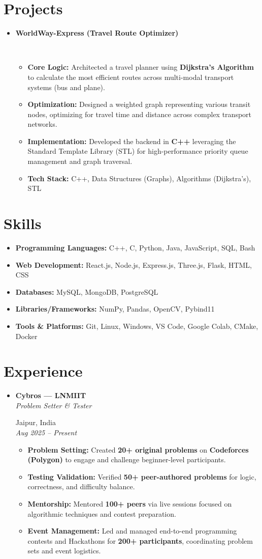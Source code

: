 \documentclass[a4paper,11pt]{article}
\newcommand{\resumeItem}[2]{
  \item\small{\textbf{#1:} #2 \vspace{-3pt}}
}
\newcommand{\resumeSubheading}[4]{%
  \item
  \begin{minipage}[t]{0.66\linewidth}%
    \textbf{#1}\\[2pt]%
    \textit{#3}%
  \end{minipage}%
  \hfill %
  \begin{minipage}[t]{0.32\linewidth}%
    \raggedleft #2 \\[2pt] \textit{#4}%
  \end{minipage}%
  \vspace{-6pt}%
}
\newcommand{\resumeSubItem}[2]{\resumeItem{#1}{#2}\vspace{-3pt}}
\newcommand{\resumeSubHeadingListStart}{\begin{itemize}[leftmargin=*]}
\newcommand{\resumeSubHeadingListEnd}{\end{itemize}\vspace{1pt}}
\newcommand{\resumeItemListStart}{\begin{itemize}[leftmargin=1.5em, label=\textbullet]}
\newcommand{\resumeItemListEnd}{\end{itemize}\vspace{-5pt}}
\begin{document}
\section{Projects}
\resumeSubHeadingListStart
\resumeSubheading
  {WorldWay-Express (Travel Route Optimizer)}
  {} %
  {}{} 
\resumeItemListStart
  \vspace{-11pt}
  \resumeItem{Core Logic}{Architected a travel planner using \textbf{Dijkstra’s Algorithm} to calculate the most efficient routes across multi-modal transport systems (bus and plane).}
  \resumeItem{Optimization}{Designed a weighted graph representing various transit nodes, optimizing for travel time and distance across complex transport networks.}
  \resumeItem{Implementation}{Developed the backend in \textbf{C++} leveraging the Standard Template Library (STL) for high-performance priority queue management and graph traversal.}
  \resumeItem{Tech Stack}{C++, Data Structures (Graphs), Algorithms (Dijkstra's), STL}
\resumeItemListEnd
\resumeSubHeadingListEnd
       \vspace{-5pt}
\section{Skills}
\resumeSubHeadingListStart
  \resumeSubItem{Programming Languages}{C++, C, Python, Java, JavaScript, SQL, Bash}
  \resumeSubItem{Web Development}{React.js, Node.js, Express.js, Three.js, Flask, HTML, CSS}
  \resumeSubItem{Databases}{MySQL, MongoDB, PostgreSQL}
  \resumeSubItem{Libraries/Frameworks}{NumPy, Pandas, OpenCV, Pybind11}
  \resumeSubItem{Tools \& Platforms}{Git, Linux, Windows, VS Code, Google Colab, CMake, Docker}
\resumeSubHeadingListEnd

\section{Experience}
\resumeSubHeadingListStart
  \resumeSubheading
    {Cybros — LNMIIT}{Jaipur, India}
    {Problem Setter \& Tester}{Aug 2025 -- Present}
  \resumeItemListStart
    \resumeItem{Problem Setting}{Created \textbf{20+ original problems} on \textbf{Codeforces (Polygon)} to engage and challenge beginner-level participants.}
    \resumeItem{Testing Validation}{Verified \textbf{50+ peer-authored problems} for logic, correctness, and difficulty balance.}
    \resumeItem{Mentorship}{Mentored \textbf{100+ peers} via live sessions focused on algorithmic techniques and contest preparation.}
 \vspace{-12pt}
    \resumeItem{Event Management}{Led and managed end-to-end programming contests and Hackathons for \textbf{200+ participants}, coordinating problem sets and event logistics.}
  \resumeItemListEnd
\resumeSubHeadingListEnd
\end{document}
